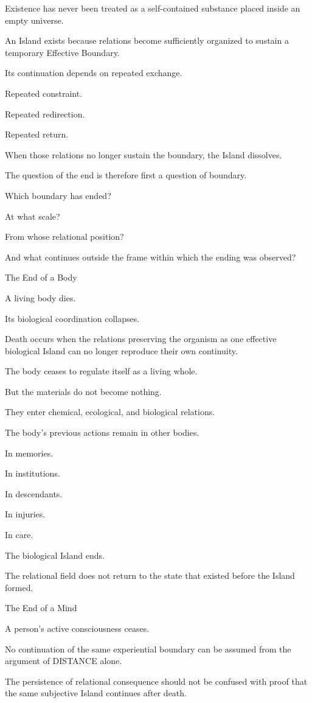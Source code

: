 Existence has never been treated as a self-contained substance placed inside an empty universe.

An Island exists because relations become sufficiently organized to sustain a temporary Effective Boundary.

Its continuation depends on repeated exchange.

Repeated constraint.

Repeated redirection.

Repeated return.

When those relations no longer sustain the boundary, the Island dissolves.

The question of the end is therefore first a question of boundary.

Which boundary has ended?

At what scale?

From whose relational position?

And what continues outside the frame within which the ending was observed?

The End of a Body

A living body dies.

Its biological coordination collapses.

Death occurs when the relations preserving the organism as one effective biological Island can no longer reproduce their own continuity.

The body ceases to regulate itself as a living whole.

But the materials do not become nothing.

They enter chemical, ecological, and biological relations.

The body’s previous actions remain in other bodies.

In memories.

In institutions.

In descendants.

In injuries.

In care.

The biological Island ends.

The relational field does not return to the state that existed before the Island formed.

The End of a Mind

A person’s active consciousness ceases.

No continuation of the same experiential boundary can be assumed from the argument of DISTANCE alone.

The persistence of relational consequence should not be confused with proof that the same subjective Island continues after death.

